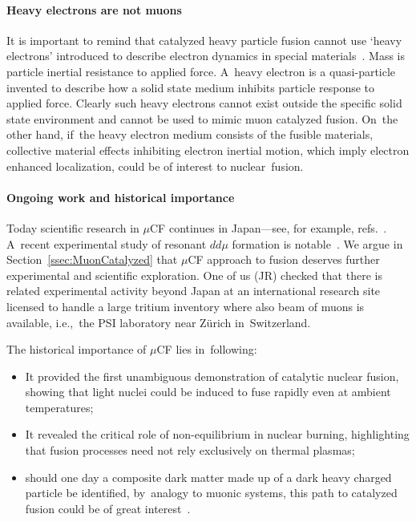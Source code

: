\documentclass[particles,article,accept,pdftex,moreauthors]{Definitions/mdpi}
\begin{document}
\vspace{-6pt}\paragraph*{\bf Heavy electrons are not muons}
It is important to remind that catalyzed heavy particle fusion cannot use `heavy electrons' introduced to describe electron dynamics in special materials~\cite{Kuramoto:2000}. Mass is particle inertial resistance to applied force. A~heavy electron is a quasi-particle invented to describe how a solid state medium inhibits particle response to applied force. Clearly such heavy electrons cannot exist outside the specific solid state environment and cannot be used to mimic muon catalyzed fusion. On~the other hand, if~the heavy electron medium consists of the fusible materials, collective material effects inhibiting electron inertial motion, which imply electron enhanced localization, could be of interest to nuclear~fusion.

\vspace{-6pt}\paragraph*{\bf Ongoing work and historical importance}
Today scientific research in $\mu$CF continues in Japan---see, for example, refs.~\cite{Kamimura:2021msf,Yamashita:2022rtu}. A~recent experimental study of resonant $dd\mu$ formation is notable~\cite{Toyama:2026}. We argue in Section~\ref{ssec:MuonCatalyzed} that $\mu$CF approach to fusion deserves further experimental and scientific exploration. One of us (JR) checked that there is related experimental activity beyond Japan at an international research site  licensed to handle a large tritium inventory where also beam of muons is available, i.e.,~the PSI laboratory near Z\"urich in~Switzerland.
 
The historical importance of $\mu$CF lies in~following:
\begin{itemize}
 \item[(a)] It provided the first unambiguous demonstration of catalytic nuclear fusion, showing that light nuclei could be induced to fuse rapidly even at ambient temperatures; 
 \item[(b)] It revealed the critical role of non-equilibrium in nuclear burning, highlighting that fusion processes need not rely exclusively on thermal plasmas;
 \item[(c)] should one day a composite dark matter made up of a dark heavy charged particle be identified, by~analogy to muonic systems, this path to catalyzed fusion could be of great interest~\cite{Rafelski:1989pz}.
\end{itemize}
\end{document}
